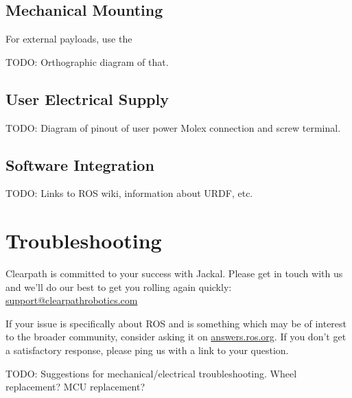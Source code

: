 \documentclass[]{clearpath-manual}
\begin{document}
\subsection{Mechanical Mounting}

For external payloads, use the 

TODO: Orthographic diagram of that.

\subsection{User Electrical Supply}\label{payload-elec}

TODO: Diagram of pinout of user power Molex connection and screw terminal.

\subsection{Software Integration}

TODO: Links to ROS wiki, information about URDF, etc.


\section{Troubleshooting}\label{trouble}

Clearpath is committed to your success with Jackal. Please get in touch with us and we'll
do our best to get you rolling again quickly: \href{mailto:support@clearpathrobotics.com}{support@clearpathrobotics.com}

If your issue is specifically about ROS and is something which may be of interest
to the broader community, consider asking it on \href{http://answers.ros.org}{answers.ros.org}.
If you don't get a satisfactory response, please ping us with a link to your question.

TODO: Suggestions for mechanical/electrical troubleshooting. Wheel replacement? MCU replacement? 
\end{document}
